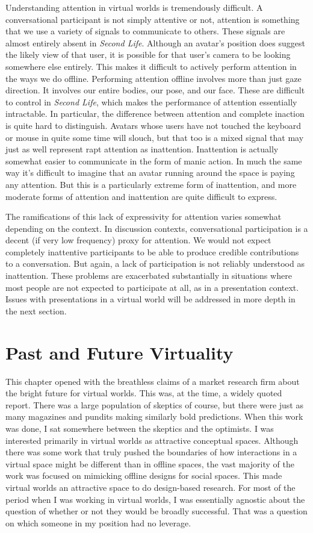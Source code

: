 Understanding attention in virtual worlds is tremendously difficult. A conversational participant is not simply attentive or not, attention is something that we use a variety of signals to communicate to others. These signals are almost entirely absent in \emph{Second Life}. Although an avatar's position does suggest the likely view of that user, it is possible for that user's camera to be looking somewhere else entirely. This makes it difficult to actively perform attention in the ways we do offline. Performing attention offline involves more than just gaze direction. It involves our entire bodies, our pose, and our face. These are difficult to control in \emph{Second Life}, which makes the performance of attention essentially intractable. In particular, the difference between attention and complete inaction is quite hard to distinguish. Avatars whose users have not touched the keyboard or mouse in quite some time will slouch, but that too is a mixed signal that may just as well represent rapt attention as inattention. Inattention is actually somewhat easier to communicate in the form of manic action. In much the same way it's difficult to imagine that an avatar running around the space is paying any attention. But this is a particularly extreme form of inattention, and more moderate forms of attention and inattention are quite difficult to express.

The ramifications of this lack of expressivity for attention varies somewhat depending on the context. In discussion contexts, conversational participation is a decent (if very low frequency) proxy for attention. We would not expect completely inattentive participants to be able to produce credible contributions to a conversation. But again, a lack of participation is not reliably understood as inattention. These problems are exacerbated substantially in situations where most people are not expected to participate at all, as in a presentation context. Issues with presentations in a virtual world will be addressed in more depth in the next section.

\section{Past and Future Virtuality}

This chapter opened with the breathless claims of a market research firm about the bright future for virtual worlds. This was, at the time, a widely quoted report. There was a large population of skeptics of course, but there were just as many magazines and pundits making similarly bold predictions. When this work was done, I sat somewhere between the skeptics and the optimists. I was interested primarily in virtual worlds as attractive conceptual spaces. Although there was some work that truly pushed the boundaries of how interactions in a virtual space might be different than in offline spaces, the vast majority of the work was focused on mimicking offline designs for social spaces. This made virtual worlds an attractive space to do design-based research. For most of the period when I was working in virtual worlds, I was essentially agnostic about the question of whether or not they would be broadly successful. That was a question on which  someone in my position had no leverage.

